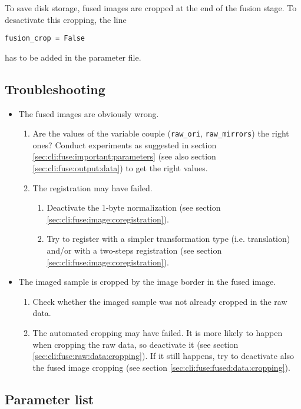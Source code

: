 To save disk storage, fused images are cropped at the end of the fusion stage. To desactivate this cropping, the line
\begin{verbatim}
fusion_crop = False
\end{verbatim}
has to be added in the parameter file.

\subsection{Troubleshooting}

\begin{itemize}

\item The fused images are obviously wrong.
  \begin{enumerate}
  \item Are the values of the variable couple (\texttt{raw\_ori}, \texttt{raw\_mirrors}) the right ones? Conduct experiments as suggested in section \ref{sec:cli:fuse:important:parameters}  (see also section \ref{sec:cli:fuse:output:data}) to get the right values.
  \item The registration may have failed.
    \begin{enumerate}
    \item Deactivate the 1-byte normalization (see section \ref{sec:cli:fuse:image:coregistration}).
    \item Try to register with a simpler transformation type (i.e. translation) and/or with a two-steps registration (see section \ref{sec:cli:fuse:image:coregistration}).
    \end{enumerate}
  \end{enumerate}
\item The imaged sample is cropped by the image border in the fused image.
  \begin{enumerate}
  \item Check whether the imaged sample was not already cropped in the raw data.
  \item The automated cropping may have failed. It is more likely to happen when cropping the raw data, so deactivate it (see section \ref{sec:cli:fuse:raw:data:cropping}). If it still happens, try to deactivate also the fused image cropping   (see section \ref{sec:cli:fuse:fused:data:cropping}).
  \end{enumerate}
\end{itemize}

\subsection{Parameter list}

